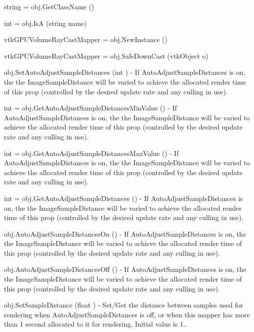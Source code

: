 \begin{DoxyItemize}
\item {\ttfamily string = obj.\-Get\-Class\-Name ()}  
\item {\ttfamily int = obj.\-Is\-A (string name)}  
\item {\ttfamily vtk\-G\-P\-U\-Volume\-Ray\-Cast\-Mapper = obj.\-New\-Instance ()}  
\item {\ttfamily vtk\-G\-P\-U\-Volume\-Ray\-Cast\-Mapper = obj.\-Safe\-Down\-Cast (vtk\-Object o)}  
\item {\ttfamily obj.\-Set\-Auto\-Adjust\-Sample\-Distances (int )} -\/ If Auto\-Adjust\-Sample\-Distances is on, the the Image\-Sample\-Distance will be varied to achieve the allocated render time of this prop (controlled by the desired update rate and any culling in use).  
\item {\ttfamily int = obj.\-Get\-Auto\-Adjust\-Sample\-Distances\-Min\-Value ()} -\/ If Auto\-Adjust\-Sample\-Distances is on, the the Image\-Sample\-Distance will be varied to achieve the allocated render time of this prop (controlled by the desired update rate and any culling in use).  
\item {\ttfamily int = obj.\-Get\-Auto\-Adjust\-Sample\-Distances\-Max\-Value ()} -\/ If Auto\-Adjust\-Sample\-Distances is on, the the Image\-Sample\-Distance will be varied to achieve the allocated render time of this prop (controlled by the desired update rate and any culling in use).  
\item {\ttfamily int = obj.\-Get\-Auto\-Adjust\-Sample\-Distances ()} -\/ If Auto\-Adjust\-Sample\-Distances is on, the the Image\-Sample\-Distance will be varied to achieve the allocated render time of this prop (controlled by the desired update rate and any culling in use).  
\item {\ttfamily obj.\-Auto\-Adjust\-Sample\-Distances\-On ()} -\/ If Auto\-Adjust\-Sample\-Distances is on, the the Image\-Sample\-Distance will be varied to achieve the allocated render time of this prop (controlled by the desired update rate and any culling in use).  
\item {\ttfamily obj.\-Auto\-Adjust\-Sample\-Distances\-Off ()} -\/ If Auto\-Adjust\-Sample\-Distances is on, the the Image\-Sample\-Distance will be varied to achieve the allocated render time of this prop (controlled by the desired update rate and any culling in use).  
\item {\ttfamily obj.\-Set\-Sample\-Distance (float )} -\/ Set/\-Get the distance between samples used for rendering when Auto\-Adjust\-Sample\-Distances is off, or when this mapper has more than 1 second allocated to it for rendering. Initial value is 1..  

\end{DoxyItemize}
